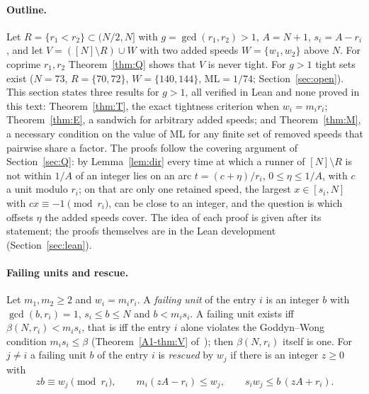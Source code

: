 \documentclass[11pt]{article}
\theoremstyle{definition}
\theoremstyle{remark}
\newcommand{\ML}{\mathrm{ML}}
\newcommand{\xA}[1]{\ref{A1-#1}}
\begin{document}
\paragraph{Outline.}
Let $R=\{r_1<r_2\}\subset(N/2,N]$ with $g=\gcd(r_1,r_2)>1$, $A=N+1$, $s_i=A-r_i$, and let $V=([N]\setminus R)\cup W$ with two added speeds $W=\{w_1,w_2\}$ above $N$. For coprime $r_1,r_2$ Theorem~\ref{thm:Q} shows that $V$ is never tight. For $g>1$ tight sets exist ($N=73$, $R=\{70,72\}$, $W=\{140,144\}$, $\ML=1/74$; Section~\ref{sec:open}). This section states three results for $g>1$, all verified in Lean and none proved in this text: Theorem~\ref{thm:T}, the exact tightness criterion when $w_i=m_ir_i$; Theorem~\ref{thm:E}, a sandwich for arbitrary added speeds; and Theorem~\ref{thm:M}, a necessary condition on the value of $\ML$ for any finite set of removed speeds that pairwise share a factor. The proofs follow the covering argument of Section~\ref{sec:Q}: by Lemma~\ref{lem:dir} every time at which a runner of $[N]\setminus R$ is not within $1/A$ of an integer lies on an arc $t=(c+\eta)/r_i$, $0\le\eta\le1/A$, with $c$ a unit modulo $r_i$; on that arc only one retained speed, the largest $x\in[s_i,N]$ with $cx\equiv-1\pmod{r_i}$, can be close to an integer, and the question is which offsets $\eta$ the added speeds cover. The idea of each proof is given after its statement; the proofs themselves are in the Lean development (Section~\ref{sec:lean}).

\paragraph{Failing units and rescue.}
Let $m_1,m_2\ge2$ and $w_i=m_ir_i$. A \emph{failing unit} of the entry $i$ is an integer $b$ with $\gcd(b,r_i)=1$, $s_i\le b\le N$ and $b<m_is_i$. A failing unit exists iff $\beta(N,r_i)<m_is_i$, that is iff the entry $i$ alone violates the Goddyn--Wong condition $m_is_i\le\beta$ (Theorem~\xA{thm:V} of~\cite{A1}); then $\beta(N,r_i)$ itself is one. For $j\ne i$ a failing unit $b$ of the entry $i$ is \emph{rescued} by $w_j$ if there is an integer $z\ge0$ with
\[
zb\equiv w_j\pmod{r_i},\qquad m_i(zA-r_i)\le w_j,\qquad s_iw_j\le b\,(zA+r_i).
\]
\end{document}
